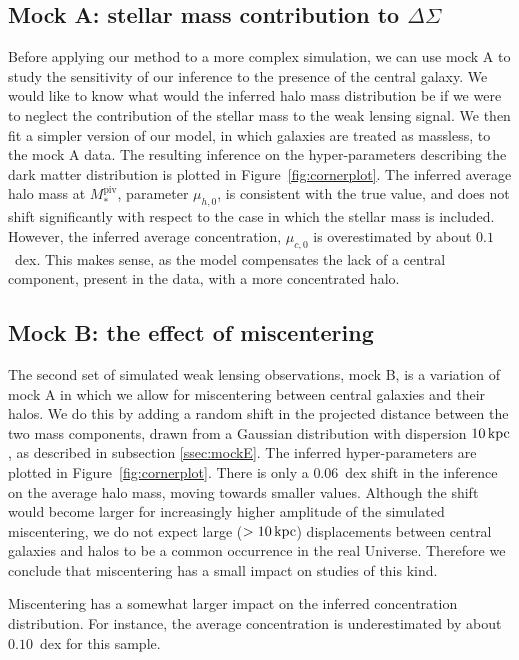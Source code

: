 \documentclass[usenatbib]{mnras}
\def\mpiv{M_*^{\mathrm{piv}}}
\def\Fref#1{Figure~\ref{#1}\xspace}
\begin{document}
\subsection{Mock A: stellar mass contribution to $\Delta\Sigma$}

Before applying our method to a more complex simulation, we can use mock A to study the sensitivity of our inference to the presence of the central galaxy. 
We would like to know what would the inferred halo mass distribution be if we were to neglect the contribution of the stellar mass to the weak lensing signal.
We then fit a simpler version of our model, in which galaxies are treated as massless, to the mock A data. The resulting inference on the hyper-parameters describing the dark matter distribution is plotted in \Fref{fig:cornerplot}.
The inferred average halo mass at $\mpiv$, parameter $\mu_{h,0}$, is consistent with the true value, and does not shift significantly with respect to the case in which the stellar mass is included. However, the inferred average concentration, $\mu_{c,0}$ is overestimated by about $0.1$~dex. This makes sense, as the model compensates the lack of a central component, present in the data, with a more concentrated halo.

\subsection{Mock B: the effect of miscentering}

The second set of simulated weak lensing observations, mock B, is a variation of mock A in which we allow for miscentering between central galaxies and their halos. We do this by adding a random shift in the projected distance between the two mass components, drawn from a Gaussian distribution with dispersion $10\,\rm{kpc}$, as described in subsection \ref{ssec:mockE}.
The inferred hyper-parameters are plotted in \Fref{fig:cornerplot}.
There is only a $0.06$~dex shift in the inference on the average halo mass, moving towards smaller values.
Although the shift would become larger for increasingly higher amplitude of the simulated miscentering, we do not expect large ($>10\,\rm{kpc}$) displacements between central galaxies and halos to be a common occurrence in the real Universe. Therefore we conclude that miscentering has a small impact on studies of this kind.

Miscentering has a somewhat larger impact on the inferred concentration distribution. For instance, the average concentration is underestimated by about $0.10$~dex for this sample.
\end{document}

